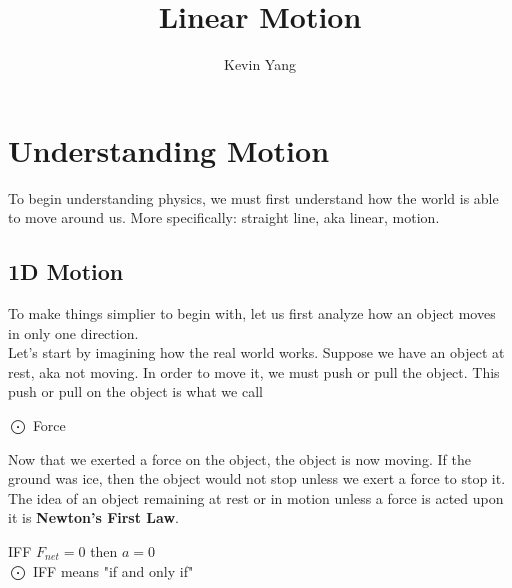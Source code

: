 \documentclass[titlepage]{article}
\title{Linear Motion}
\author{Kevin Yang}
\date{}
\begin{document}
\maketitle
\section{Understanding Motion}
To begin understanding physics, we must first understand how the world is able to move around us. More specifically: straight line, aka linear, motion.

\subsection{1D Motion}
To make things simplier to begin with, let us first analyze how an object moves in only one direction. 
\\
Let's start by imagining how the real world works. Suppose we have an object at rest, aka not moving. 
In order to move it, we must push or pull the object. This push or pull on the object is what we call 
\begin{center}
	$\bigodot$ Force
\end{center}
Now that we exerted a force on the object, the object is now moving. If the ground was ice, then the object would not stop unless we exert a force to stop it. 
\\
The idea of an object remaining at rest or in motion unless a force is acted upon it is \textbf{Newton's First Law}.
\begin{center}
	\begin{framed}
		IFF $F_{net} = 0$ then $a = 0$
		\\
		$\bigodot$ IFF means "if and only if"
	\end{framed}	
\end{center}
\end{document}
